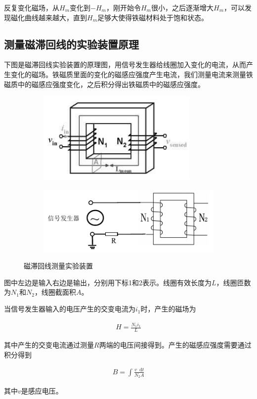 \documentclass{article}
\newcommand*{\md}{\mathop{}\!\mathrm{d}}
\begin{document}
反复变化磁场，从$H_m$变化到$-H_m$，刚开始令$H_m$很小，之后逐渐增大$H_m$，可以发现磁化曲线越来越大，直到$H_m$足够大使得铁磁材料处于饱和状态。

\subsection{测量磁滞回线的实验装置原理}

下图是磁滞回线实验装置的原理图，用信号发生器给线圈加入变化的电流，从而产生变化的磁场。铁磁质里面的变化的磁感应强度产生电流，我们测量电流来测量铁磁质中的磁感应强度变化，之后积分得出铁磁质中的磁感应强度。

\begin{figure}[H]
  \centering
  \begin{subfigure}{0.38\linewidth}
    \includegraphics[width=\linewidth]{figures/磁滞回线装置-线圈}
  \end{subfigure}
  \begin{subfigure}{0.58\linewidth}
    \includegraphics[width=\linewidth]{figures/磁滞回线装置-测量电路}
  \end{subfigure}
  \caption{磁滞回线测量实验装置}
\end{figure}

图中左边是输入右边是输出，分别用下标1和2表示。线圈有效长度为$L$，线圈匝数为$N_1$和$N_2$，线圈截面积$A$。

当信号发生器输入的电压产生的交变电流为$i_1$时，产生的磁场为

\begin{equation*}
  \begin{aligned}
    H = \frac{N_1 i_1}{L}
  \end{aligned}
\end{equation*}

其中产生的交变电流通过测量$R$两端的电压间接得到。产生的磁感应强度需要通过积分得到

\begin{equation*}
  \begin{aligned}
    B = \int \frac{v\md t}{N_2 A}
  \end{aligned}
\end{equation*}

其中$v$是感应电压。
\end{document}
